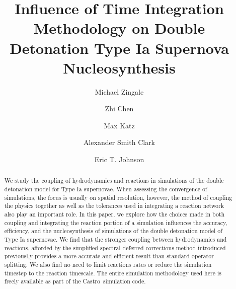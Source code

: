 \documentclass[modern]{aastex631}
\newcommand{\castro}{{\sf Castro}}
\begin{document}
\title{Influence of Time Integration Methodology on Double Detonation Type
Ia Supernova Nucleosynthesis}


\author[0000-0001-8401-030X]{Michael Zingale}

\author[0000-0002-2839-107X]{Zhi Chen}


\author[0000-0003-0439-4556]{Max Katz}


\author[0000-0001-5961-1680]{Alexander Smith Clark}

\author[0000-0003-3603-6868]{Eric T. Johnson}



\begin{abstract}
We study the coupling of hydrodynamics and reactions in simulations of
the double detonation model for Type Ia supernovae.  When assessing the
convergence of simulations, the focus is usually on spatial resolution, 
however, the method of coupling the physics together as well as the
tolerances used in integrating a reaction network also play an important role.
In this paper, we explore how the choices made in both coupling and integrating the reaction
portion of a simulation influences the accuracy, efficiency, and the nucleosynthesis
of simulations of the double detonation model of Type Ia supernovae.
We find that the stronger coupling between hydrodynamics and reactions,
afforded by the simplified spectral deferred corrections method introduced
previousl,y provides a more accurate and efficient result than standard
operator splitting.  We also find no need to limit reactions rates or reduce the
simulation timestep to the reaction timescale.  The entire simulation
methodology used here is freely available as part of the \castro\ simulation
code.
\end{abstract}
\end{document}
